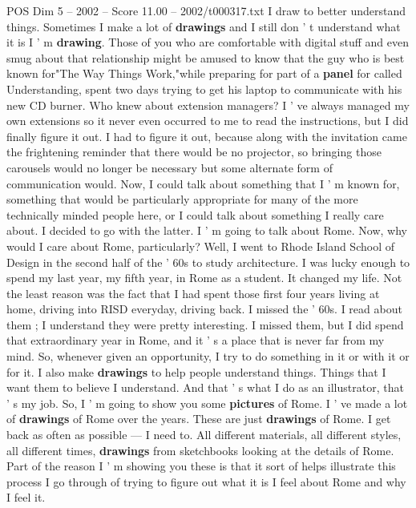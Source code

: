 \begin{textsample}{POS Dim 5 – 2002 – Score 11.00 – 2002/t000317.txt}  \label{ex:f5_pos_003}
I draw to better understand things.
Sometimes I make a lot of \textbf{drawings} and I still don ' t understand what it is I ' m \textbf{drawing}.
Those of you who are comfortable with digital stuff and even smug about that relationship might be amused to know that the guy who is best known for"The Way Things Work,"while preparing for part of a \textbf{panel} for called Understanding, spent two days trying to get his laptop to communicate with his new CD burner.
Who knew about extension managers?
I ' ve always managed my own extensions so it never even occurred to me to read the instructions, but I did finally figure it out.
I had to figure it out, because along with the invitation came the frightening reminder that there would be no projector, so bringing those carousels would no longer be necessary but some alternate form of communication would.
Now, I could talk about something that I ' m known for, something that would be particularly appropriate for many of the more technically minded people here, or I could talk about something I really care about.
I decided to go with the latter.
I ' m going to talk about Rome.
Now, why would I care about Rome, particularly?
Well, I went to Rhode Island School of Design in the second half of the ' 60s to study architecture.
I was lucky enough to spend my last year, my fifth year, in Rome as a student.
It changed my life.
Not the least reason was the fact that I had spent those first four years living at home, driving into RISD everyday, driving back.
I missed the ' 60s.
I read about them ; I understand they were pretty interesting.
I missed them, but I did spend that extraordinary year in Rome, and it ' s a place that is never far from my mind.
So, whenever given an opportunity, I try to do something in it or with it or for it.
I also make \textbf{drawings} to help people understand things.
Things that I want them to believe I understand.
And that ' s what I do as an illustrator, that ' s my job.
So, I ' m going to show you some \textbf{pictures} of Rome.
I ' ve made a lot of \textbf{drawings} of Rome over the years.
These are just \textbf{drawings} of Rome.
I get back as often as possible — I need to.
All different materials, all different styles, all different times, \textbf{drawings} from sketchbooks looking at the details of Rome.
Part of the reason I ' m showing you these is that it sort of helps illustrate this process I go through of trying to figure out what it is I feel about Rome and why I feel it.

\end{textsample}
